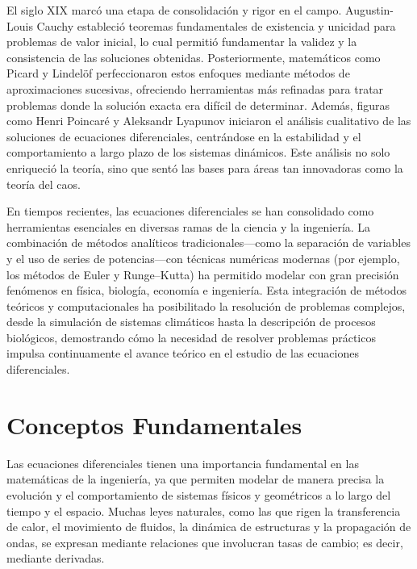 El siglo XIX marcó una etapa de consolidación y rigor en el campo. Augustin-Louis Cauchy estableció teoremas fundamentales de existencia y unicidad para problemas de valor inicial, lo cual permitió fundamentar la validez y la consistencia de las soluciones obtenidas. Posteriormente, matemáticos como Picard y Lindelöf perfeccionaron estos enfoques mediante métodos de aproximaciones sucesivas, ofreciendo herramientas más refinadas para tratar problemas donde la solución exacta era difícil de determinar. Además, figuras como Henri Poincaré y Aleksandr Lyapunov iniciaron el análisis cualitativo de las soluciones de ecuaciones diferenciales, centrándose en la estabilidad y el comportamiento a largo plazo de los sistemas dinámicos. Este análisis no solo enriqueció la teoría, sino que sentó las bases para áreas tan innovadoras como la teoría del caos.

En tiempos recientes, las ecuaciones diferenciales se han consolidado como herramientas esenciales en diversas ramas de la ciencia y la ingeniería. La combinación de métodos analíticos tradicionales—como la separación de variables y el uso de series de potencias—con técnicas numéricas modernas (por ejemplo, los métodos de Euler y Runge–Kutta) ha permitido modelar con gran precisión fenómenos en física, biología, economía e ingeniería. Esta integración de métodos teóricos y computacionales ha posibilitado la resolución de problemas complejos, desde la simulación de sistemas climáticos hasta la descripción de procesos biológicos, demostrando cómo la necesidad de resolver problemas prácticos impulsa continuamente el avance teórico en el estudio de las ecuaciones diferenciales.

\section{Conceptos Fundamentales}
Las ecuaciones diferenciales tienen una importancia fundamental en las matemáticas de la ingeniería, ya que permiten modelar de manera precisa la evolución y el comportamiento de sistemas físicos y geométricos a lo largo del tiempo y el espacio. Muchas leyes naturales, como las que rigen la transferencia de calor, el movimiento de fluidos, la dinámica de estructuras y la propagación de ondas, se expresan mediante relaciones que involucran tasas de cambio; es decir, mediante derivadas.

